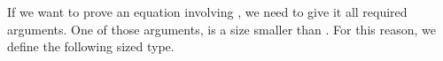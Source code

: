If we want to prove an equation involving , we need to give it all required arguments.
One of those arguments, is a size smaller than .
For this reason, we define the following sized type.

\begin{code}%
\>[0]\AgdaSpace{}%
\AgdaSymbol{:}\AgdaSpace{}%
\<%
\\
\>[0]\AgdaSpace{}%
\AgdaSpace{}%
\AgdaSymbol{=}\AgdaSpace{}%
\AgdaSpace{}%
\<%
\end{code}
